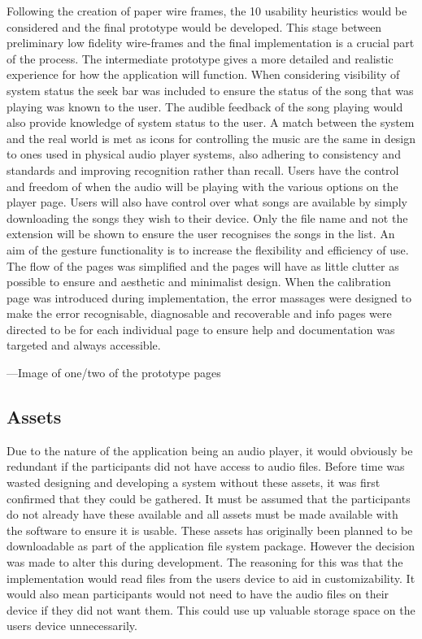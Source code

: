 \documentclass{l4proj}
\begin{document}
Following the creation of paper wire frames, the 10 usability heuristics would be considered and the final prototype would be developed. This stage between preliminary low fidelity wire-frames and the final implementation is a crucial part of the process. The intermediate prototype gives a more detailed and realistic experience for how the application will function. When considering visibility of system status the seek bar was included to ensure the status of the song that was playing was known to the user. The audible feedback of the song playing would also provide knowledge of system status to the user. A match between the system and the real world is met as icons for controlling the music are the same in design to ones used in physical audio player systems, also adhering to consistency and standards and improving recognition rather than recall. Users have the control and freedom of when the audio will be playing with the various options on the player page. Users will also have control over what songs are available by simply downloading the songs they wish to their device. Only the file name and not the extension will be shown to ensure the user recognises the songs in the list. An aim of the gesture functionality is to increase the flexibility and efficiency of use. The flow of the pages was simplified and the pages will have as little clutter as possible to ensure and aesthetic and minimalist design. When the calibration page was introduced during implementation, the error massages were designed to make the error recognisable, diagnosable and recoverable and info pages were directed to be for each individual page to ensure help and documentation was targeted and always accessible.

---Image of one/two of the prototype pages


\subsection{Assets}

Due to the nature of the application being an audio player, it would obviously be redundant if the participants did not have access to audio files. Before time was wasted designing and developing a system without these assets, it was first confirmed that they could be gathered. It must be assumed that the participants do not already have these available and all assets must be made available with the software to ensure it is usable. These assets has originally been planned to be downloadable as part of the application file system package. However the decision was made to alter this during development. The reasoning for this was that the implementation would read files from the users device to aid in customizability. It would also mean participants would not need to have the audio files on their device if they did not want them. This could use up valuable storage space on the users device unnecessarily. 
\end{document}
